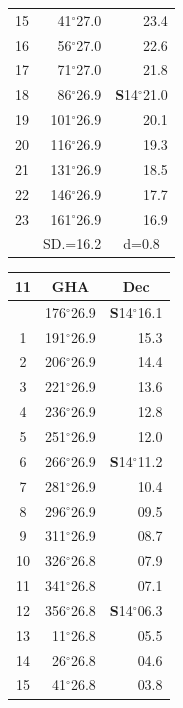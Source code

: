 \documentclass[10pt, a4paper]{report}
\begin{document}
\begin{scriptsize}
\begin{tabular*}{0.2\textwidth}[t]{@{\extracolsep{\fill}}|c|rr|}
15 & 41$^\circ$27.0 & \raisebox{0.24ex}{\boldmath$\cdot$~\boldmath$\cdot$~~}23.4\\
16 & 56$^\circ$27.0 & 22.6\\
17 & 71$^\circ$27.0 & 21.8\\[2Pt]
18 & 86$^\circ$26.9 & \textbf{S}14$^\circ$21.0\\
19 & 101$^\circ$26.9 & 20.1\\
20 & 116$^\circ$26.9 & 19.3\\
21 & 131$^\circ$26.9 & \raisebox{0.24ex}{\boldmath$\cdot$~\boldmath$\cdot$~~}18.5\\
22 & 146$^\circ$26.9 & 17.7\\
23 & 161$^\circ$26.9 & 16.9\\
\hline
\rule{0pt}{2.4ex} & \multicolumn{1}{c}{SD.=16.2} & \multicolumn{1}{c|}{d=0.8}\\
\hline
\end{tabular*}\noindent
\begin{tabular*}{0.2\textwidth}[t]{@{\extracolsep{\fill}}|c|rr|}
\hline
\multicolumn{1}{|c|}{\rule{0pt}{2.6ex}\textbf{11}} & \multicolumn{1}{c}{\textbf{GHA}} & \multicolumn{1}{c|}{\textbf{Dec}}\\
\hline\rule{0pt}{2.6ex}\noindent
0 & 176$^\circ$26.9 & \textbf{S}14$^\circ$16.1\\
1 & 191$^\circ$26.9 & 15.3\\
2 & 206$^\circ$26.9 & 14.4\\
3 & 221$^\circ$26.9 & \raisebox{0.24ex}{\boldmath$\cdot$~\boldmath$\cdot$~~}13.6\\
4 & 236$^\circ$26.9 & 12.8\\
5 & 251$^\circ$26.9 & 12.0\\[2Pt]
6 & 266$^\circ$26.9 & \textbf{S}14$^\circ$11.2\\
7 & 281$^\circ$26.9 & 10.4\\
8 & 296$^\circ$26.9 & 09.5\\
9 & 311$^\circ$26.9 & \raisebox{0.24ex}{\boldmath$\cdot$~\boldmath$\cdot$~~}08.7\\
10 & 326$^\circ$26.8 & 07.9\\
11 & 341$^\circ$26.8 & 07.1\\[2Pt]
12 & 356$^\circ$26.8 & \textbf{S}14$^\circ$06.3\\
13 & 11$^\circ$26.8 & 05.5\\
14 & 26$^\circ$26.8 & 04.6\\
15 & 41$^\circ$26.8 & \raisebox{0.24ex}{\boldmath$\cdot$~\boldmath$\cdot$~~}03.8\\

\end{tabular*}
\end{scriptsize}
\end{document}
